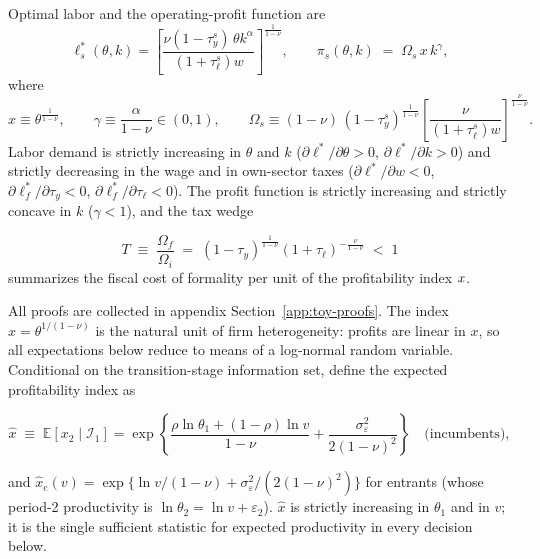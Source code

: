 \documentclass[12pt]{article}
\begin{document}
\begin{lemma}
\label{lem:static}
Optimal labor and the operating-profit function are
\begin{equation}
  \ell^{*}_{s}(\theta,k)
  = \left[\frac{\nu(1-\tau_y^{s})\,\theta k^{\alpha}}
                {(1+\tau_{\ell}^{s})w}\right]^{\frac{1}{1-\nu}},
  \qquad
  \pi_{s}(\theta,k) \;=\; \Omega_{s}\,x\,k^{\gamma},
  \label{eq:toy-profit}
\end{equation}
where
\begin{equation}
  x \equiv \theta^{\frac{1}{1-\nu}},\qquad
  \gamma \equiv \frac{\alpha}{1-\nu}\in(0,1),\qquad
  \Omega_{s} \equiv (1-\nu)\,(1-\tau_y^{s})^{\frac{1}{1-\nu}}
  \left[\frac{\nu}{(1+\tau_{\ell}^{s})w}\right]^{\frac{\nu}{1-\nu}} .
  \label{eq:toy-omega}
\end{equation}
 Labor demand is strictly increasing in $\theta$ and $k$ ($\partial\ell^{*}/\partial\theta>0$, $\partial\ell^{*}/\partial k>0$) and strictly decreasing in the wage and in own-sector taxes ($\partial\ell^{*}/\partial w<0$, $\partial\ell^{*}_{f}/\partial\tau_y<0$, $\partial\ell^{*}_{f}/\partial\tau_{\ell}<0$). The profit function is strictly increasing and strictly concave in $k$ ($\gamma<1$), and the tax wedge
 
\begin{equation}
  T \;\equiv\; \frac{\Omega_{f}}{\Omega_{i}}
  \;=\; (1-\tau_y)^{\frac{1}{1-\nu}} (1+\tau_{\ell})^{-\frac{\nu}{1-\nu}}
  \;<\;1
  \label{eq:toy-T}
\end{equation}
summarizes the fiscal cost of formality per unit of the profitability
index $x$.
\end{lemma}
 
All proofs are collected in appendix Section~\ref{app:toy-proofs}. The index $x=\theta^{1/(1-\nu)}$ is the natural unit of firm heterogeneity: profits are linear in $x$, so all expectations below reduce to means of a log-normal random variable. Conditional on the transition-stage information set, define the expected profitability index as

\begin{equation}
  \hat x \;\equiv\; \mathbb{E} \!\left[x_{2}\mid \mathcal{I}_{1}\right]
  = \exp\!\left\{\frac{\rho\ln\theta_{1}+(1-\rho)\ln v}{1-\nu}
    + \frac{\sigma_{\varepsilon}^{2}}{2(1-\nu)^{2}}\right\}
  \quad\text{(incumbents)},
  \label{eq:toy-xhat}
\end{equation}


and $\hat x_{e}(v)=\exp\{\ln v/(1-\nu) +\sigma_{\varepsilon}^{2}/(2(1-\nu)^{2})\}$ for entrants (whose period-2 productivity is $\ln\theta_{2}=\ln v+\varepsilon_{2}$). $\hat x$ is strictly increasing in $\theta_{1}$ and in $v$; it is the single sufficient statistic for expected productivity in every decision below.
\end{document}

